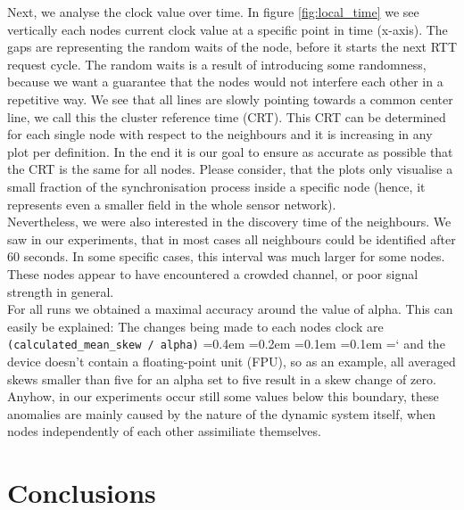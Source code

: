 \documentclass{llncs}
\newcommand{\code}[1]{%
    \texttt{#1}%
    \fontdimen2\font=0.4em
    \fontdimen3\font=0.2em
    \fontdimen4\font=0.1em
    \fontdimen7\font=0.1em
    \hyphenchar\font=`\-
}
\begin{document}
\noindent Next, we analyse the clock value over time. In figure \ref{fig:local_time} we see vertically each nodes current clock value at a specific point in time (x-axis). The gaps are representing the random waits of the node, before it starts the next RTT request cycle. The random waits is a result of introducing some randomness, because we want a guarantee that the nodes would not interfere each other in a repetitive way. We see that all lines are slowly pointing towards a common center line, we call this the cluster reference time (CRT). This CRT can be determined for each single node with respect to the neighbours and it is  increasing in any plot per definition. In the end it is our goal to ensure as accurate as possible that the CRT is the same for all nodes. Please consider, that the plots only visualise a small fraction of the synchronisation process inside a specific node (hence, it represents even a smaller field in the whole sensor network).\\
\indent Nevertheless, we were also interested in the discovery time of the neighbours. We saw in our experiments, that  in most cases all neighbours could be identified after 60 seconds. In some specific cases, this interval was much larger for some nodes. These nodes appear to have encountered a crowded channel, or poor signal strength in general.\\
\indent For all runs we obtained a maximal accuracy around the value of alpha. This can easily be explained: The changes being made to each nodes clock are \code{(calculated\_mean\_skew / alpha)} and the device doesn't contain a float\-ing-point unit (FPU), so as an example, all averaged skews smaller than five for an alpha set to five result in a skew change of zero. Anyhow, in our experiments occur still some values below this boundary, these anomalies are mainly caused by the nature of the dynamic system itself, when nodes independently of each other assimiliate themselves.

\section{Conclusions}
\end{document}
